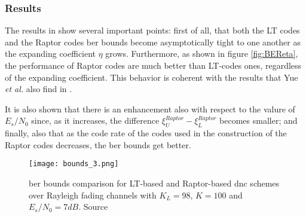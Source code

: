\subsubsection{Results}
The results in \cite{Yue2013} show several important points: first of all, that both the LT codes and the Raptor codes \gls{ber} bounds become asymptotically tight to one another as the expanding coefficient $\eta$ grows. Furthermore, as shown in figure \autoref{fig:BEReta}, the performance of Raptor codes are much better than LT-codes ones, regardless of the expanding coefficient. This behavior is coherent with the results that Yue \textit{et al.} also find in \cite{Yue2014}.

It is also shown that there is an enhancement also with respect to the valure of $E_s/N_0$ since, as it increases, the difference $\xi_U^{Raptor}-\xi_L^{Raptor}$ becomes smaller; and finally, also that as the code rate of the codes used in the construction of the Raptor codes decreases, the \gls{ber} bounds get better.
\begin{SCfigure}
  \texttt{[image: bounds\_3.png]}
  \caption{\gls{ber} bounds comparison for LT-based and Raptor-based \gls{dnc} schemes over Rayleigh fading channels with $K_L = 98$, $K = 100$ and $E_s/N_0 = 7dB$. Source \cite{Yue2013}}
  \label{fig:BEReta}
\end{SCfigure}

